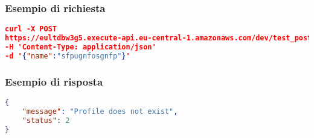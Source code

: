 \subsubsection{Esempio di richiesta}
\begin{lstlisting}[language=json, caption={Esempio di richiesta \texttt{/test\_post}}, captionpos=b]
curl -X POST 
https://eultdbw3g5.execute-api.eu-central-1.amazonaws.com/dev/test_post
-H 'Content-Type: application/json'
-d '{"name":"sfpugnfosgnfp"}'
\end{lstlisting}

\subsubsection{Esempio di risposta}
\begin{lstlisting}[language=json, caption={Esempio di risposta \texttt{/test\_post}}, captionpos=b]
{
    "message": "Profile does not exist",
    "status": 2
}
\end{lstlisting}

